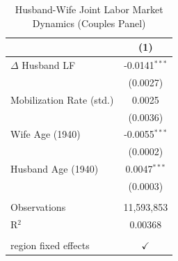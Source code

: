 
\begin{table}[htbp]
   \caption{\label{tab:hwdynamics} Husband-Wife Joint Labor Market Dynamics (Couples Panel)}
   \bigskip
   \centering
   \begin{tabular}{lc}
      \toprule
                               & (1)\\  
      \midrule 
      $\Delta$ Husband LF      & -0.0141$^{***}$\\   
                               & (0.0027)\\   
      Mobilization Rate (std.) & 0.0025\\   
                               & (0.0036)\\   
      Wife Age (1940)          & -0.0055$^{***}$\\   
                               & (0.0002)\\   
      Husband Age (1940)       & 0.0047$^{***}$\\   
                               & (0.0003)\\   
       \\
      Observations             & 11,593,853\\  
      R$^2$                    & 0.00368\\  
       \\
      region fixed effects     & $\checkmark$\\   
      \bottomrule
   \end{tabular}
\end{table}


